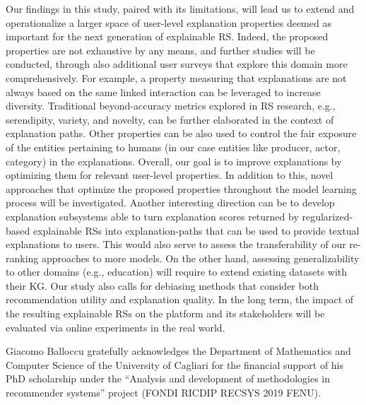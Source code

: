 \documentclass[sigconf]{acmart}
\begin{document}
Our findings in this study, paired with its limitations, will lead us to extend and operationalize a larger space of user-level explanation properties deemed as important for the next generation of explainable RS. Indeed, the proposed properties are not exhaustive by any means, and further studies will be conducted, through also additional user surveys that explore this domain more comprehensively. For example, a property measuring that explanations are not always based on the same linked interaction can be leveraged to increase diversity. Traditional beyond-accuracy metrics explored in RS research, e.g., serendipity, variety, and novelty, can be further elaborated in the context of explanation paths. Other properties can be also used to control the fair exposure of the entities pertaining to humans (in our case entities like producer, actor, category) in the explanations. Overall, our goal is to improve explanations by  optimizing them for relevant user-level properties. In addition to this, novel approaches that optimize the proposed properties throughout the model learning process will be investigated. Another interesting direction can be to develop explanation subsystems able to turn explanation scores returned by regularized-based explainable RSs into explanation-paths that can be used to provide textual explanations to users. This would also serve to assess the transferability of our re-ranking approaches to more models. On the other hand, assessing generalizability to other domains (e.g., education) will require to extend existing datasets with their KG. Our study also calls for debiasing methods that consider both recommendation utility and explanation quality. In the long term, the impact of the resulting explainable RSs on the platform and its stakeholders will be evaluated via online experiments in the real world.

\begin{acks}
Giacomo Balloccu gratefully acknowledges the Department of Mathematics and Computer Science of the University of Cagliari for the financial support of his PhD scholarship under the ``Analysis and development of methodologies in recommender systems'' project (FONDI RICDIP RECSYS 2019 FENU).
\end{acks}
\balance


\end{document}
